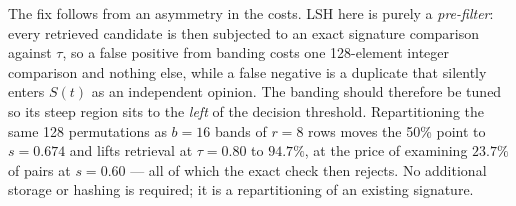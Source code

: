\documentclass[11pt]{article}
\begin{document}
The fix follows from an asymmetry in the costs. LSH here is purely a
\emph{pre-filter}: every retrieved candidate is then subjected to an exact
signature comparison against $\tau$, so a false positive from banding costs one
128-element integer comparison and nothing else, while a false negative is a
duplicate that silently enters $S(t)$ as an independent opinion. The banding
should therefore be tuned so its steep region sits to the \emph{left} of the
decision threshold. Repartitioning the same 128 permutations as $b = 16$ bands
of $r = 8$ rows moves the 50\% point to $s = 0.674$ and lifts retrieval at
$\tau = 0.80$ to $94.7\%$, at the price of examining $23.7\%$ of pairs at
$s = 0.60$ --- all of which the exact check then rejects. No additional storage
or hashing is required; it is a repartitioning of an existing signature.
\end{document}
